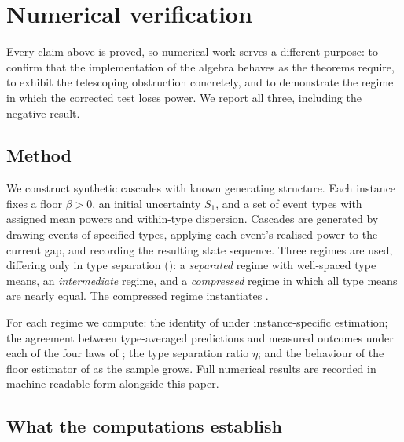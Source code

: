 \documentclass[11pt,a4paper]{article}
\theoremstyle{thmstyle}
\theoremstyle{definition}
\theoremstyle{remark}
\newcommand{\flo}{\beta}
\begin{document}
\section{Numerical verification}
\label{sec:validation}

Every claim above is proved, so numerical work serves a different purpose:
to confirm that the implementation of the algebra behaves as the theorems
require, to exhibit the telescoping obstruction concretely, and to
demonstrate the regime in which the corrected test loses power. We report
all three, including the negative result.

\subsection{Method}

We construct synthetic cascades with known generating structure. Each
instance fixes a floor $\flo>0$, an initial uncertainty $S_1$, and a set of
event types with assigned mean powers and within-type dispersion. Cascades
are generated by drawing events of specified types, applying each event's
realised power to the current gap, and recording the resulting state
sequence. Three regimes are used, differing only in type separation
\textup{(}\textup{)}: a \emph{separated} regime with
well-spaced type means, an \emph{intermediate} regime, and a
\emph{compressed} regime in which all type means are nearly equal. The
compressed regime instantiates .

For each regime we compute: the identity of  under
instance-specific estimation; the agreement between type-averaged
predictions and measured outcomes under each of the four laws of
; the type separation ratio $\eta$; and the behaviour
of the floor estimator of  as the sample grows.
Full numerical results are recorded in machine-readable form alongside this
paper.

\subsection{What the computations establish}
\end{document}
